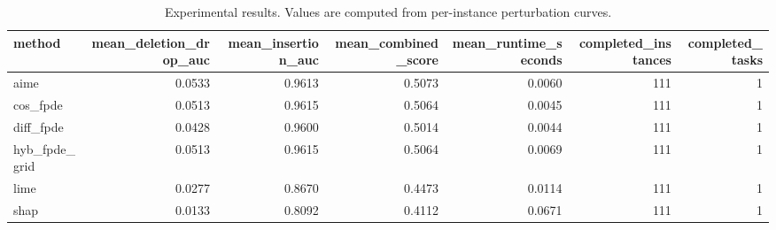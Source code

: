 \begin{table}[t]
\caption{Experimental results. Values are computed from per-instance perturbation curves.}
\label{tab:main_results_computed}
\centering
\begin{tabular}{lrrrrrr}
\toprule
method & mean\_deletion\_drop\_auc & mean\_insertion\_auc & mean\_combined\_score & mean\_runtime\_seconds & completed\_instances & completed\_tasks \\
\midrule
aime & 0.0533 & 0.9613 & 0.5073 & 0.0060 & 111 & 1 \\
cos\_fpde & 0.0513 & 0.9615 & 0.5064 & 0.0045 & 111 & 1 \\
diff\_fpde & 0.0428 & 0.9600 & 0.5014 & 0.0044 & 111 & 1 \\
hyb\_fpde\_grid & 0.0513 & 0.9615 & 0.5064 & 0.0069 & 111 & 1 \\
lime & 0.0277 & 0.8670 & 0.4473 & 0.0114 & 111 & 1 \\
shap & 0.0133 & 0.8092 & 0.4112 & 0.0671 & 111 & 1 \\
\bottomrule
\end{tabular}

\end{table}
